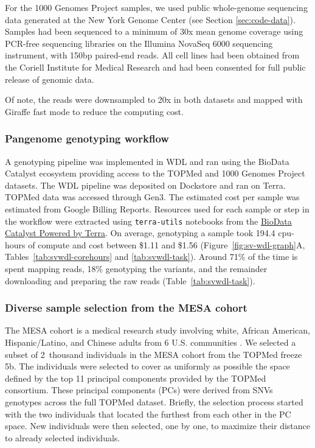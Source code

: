 \documentclass[11pt]{ucscthesis}
\begin{document}
For the 1000 Genomes Project samples, we used public whole-genome sequencing data generated at the New York Genome Center\cite{1000gp_nygc_2021} (see Section \ref{sec:code-data}).
Samples had been sequenced to a minimum of 30x mean genome coverage using PCR-free sequencing libraries on the Illumina NovaSeq 6000 sequencing instrument, with 150bp paired-end reads.
All cell lines had been obtained from the Coriell Institute for Medical Research and had been consented for full public release of genomic data.

Of note, the reads were downsampled to 20x in both datasets and mapped with Giraffe fast mode to reduce the computing cost.

\subsubsection{Pangenome genotyping workflow}

A genotyping pipeline was implemented in WDL and ran using the BioData Catalyst ecosystem\cite{bdc2020} providing access to the TOPMed and 1000 Genomes Project datasets.
The WDL pipeline was deposited on Dockstore\cite{vgsv_dockstore} and ran on Terra.
TOPMed data was accessed through Gen3.
The estimated cost per sample was estimated from Google Billing Reports.
Resources used for each sample or step in the workflow were extracted using \texttt{terra-utils} notebooks from the \href{https://biodatacatalyst.nhlbi.nih.gov/platforms/terra}{BioData Catalyst Powered by Terra}.
On average, genotyping a sample took 194.4 cpu-hours of compute and cost between \$1.11 and \$1.56 (Figure~\ref{fig:sv-wdl-graph}A, Tables~\ref{tab:svwdl-corehours} and \ref{tab:svwdl-task}).
Around 71\% of the time is spent mapping reads, 18\% genotyping the variants, and the remainder downloading and preparing the raw reads (Table~\ref{tab:svwdl-task}).


\subsubsection{Diverse sample selection from the MESA cohort}
\label{subsec:mesaselection}

The MESA cohort is a medical research study involving white, African American, Hispanic/Latino, and Chinese adults from 6 U.S. communities \cite{bild2002multi}.
We selected a subset of 2~thousand individuals in the MESA cohort from the TOPMed freeze 5b.
The individuals were selected to cover as uniformly as possible the space defined by the top 11 principal components provided by the TOPMed consortium.
These principal components (PCs) were derived from SNVs genotypes across the full TOPMed dataset.
Briefly, the selection process started with the two individuals that located the furthest from each other in the PC space.
New individuals were then selected, one by one, to maximize their distance to already selected individuals.
\end{document}
